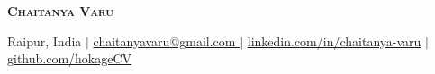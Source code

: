 \begin{center}
    \textbf{\Huge \scshape Chaitanya Varu} \\ \vspace{1pt}
    
    \small {} Raipur, India $|$ 
    \href{mailto:x@x.com}{  chaitanyavaru@gmail.com } $|$ 
    \href{https://www.linkedin.com/in/chaitanya-varu/}{ linkedin.com/in/chaitanya-varu} $|$
    \href{https://github.com/hokageCV}{ github.com/hokageCV}
\end{center}
